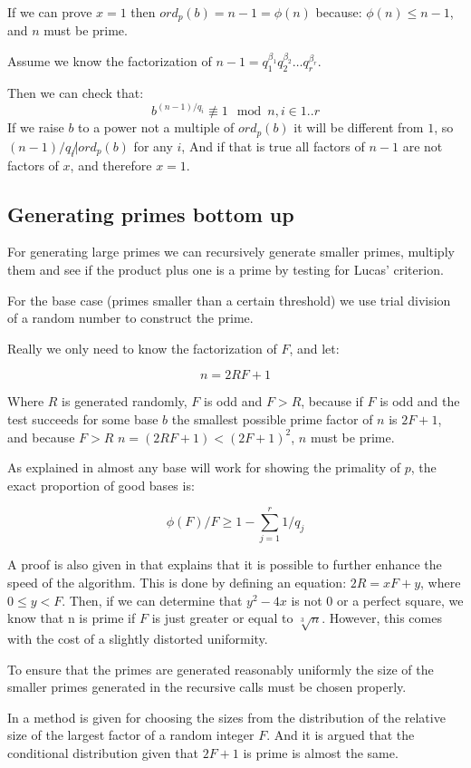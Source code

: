 \documentclass[11pt,a4paper]{article}
\begin{document}
If we can prove $x=1$ then $ord_p(b)=n-1=\phi(n)$ because: $\phi(n) \leq
n-1$, and $n$ must be prime.

Assume we know the factorization of $n-1 = q_1^{\beta_1}q_2^{\beta_2}\ldots q_r^{\beta_r}$.

Then we can check that:
\[b^{(n-1)/q_i}\not\equiv 1 \mod n, i\in{1..r}\] If we raise $b$
to a power not a multiple of $ord_p(b)$ it will be different from $1$,
so $(n-1)/q_i\not|ord_p(b)$ for any $i$, And if that is true all
factors of $n-1$ are not factors of $x$, and therefore $x=1$.
\subsection{Generating primes bottom up}
For generating large primes we can recursively generate smaller
primes, multiply them and see if the product plus one is a prime by
testing for Lucas' criterion.

For the base case (primes smaller than a certain threshold) we use
trial division of a random number to construct the prime.

Really we only need to know the factorization of $F$, and let:

\[n = 2RF+1\] 

Where $R$ is generated randomly, $F$ is odd and $F>R$, because if $F$
is odd and the test succeeds for some base $b$ the smallest possible
prime factor of $n$ is $2F+1$, and because $F>R$ $n=(2RF+1)<(2F+1)^2$,
$n$ must be prime.

As explained in \cite{Maurer} almost any base will work
for showing the primality of $p$, the exact proportion of good bases
is:

\[\phi(F)/F \geq 1-\sum^r_{j=1}1/q_j\]

A proof is also given in \cite{Maurer} that explains that
it is possible to further enhance the speed of the algorithm. This is done
by defining an equation: $2R = xF + y$, where $0\le y < F$. Then, if we can 
determine that $y^2 - 4x$ is not 0 or a perfect square, we know that n 
is prime if $F$ is just greater or equal to $\sqrt[3]{n}$. However, this
comes with the cost of a slightly distorted uniformity.

To ensure that the primes are generated reasonably uniformly the size
of the smaller primes generated in the recursive calls must be chosen
properly.

In \cite{Maurer} a method is given for choosing the sizes
from the distribution of the relative size of the largest factor of a
random integer $F$. And it is argued that the conditional distribution
given that $2F+1$ is prime is almost the same.
\end{document}
